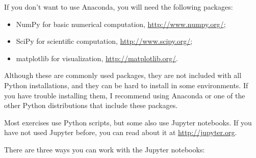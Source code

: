If you don't want to use Anaconda, you will need the following
packages:

\begin{itemize}
	
	\item NumPy for basic numerical computation, \url{http://www.numpy.org/};
	
	\item SciPy for scientific computation,
	\url{http://www.scipy.org/};
	
	\item matplotlib for visualization, \url{http://matplotlib.org/}.
	
\end{itemize}

Although these are commonly used packages, they are not included with
all Python installations, and they can be hard to install in some
environments.  If you have trouble installing them, I
recommend using Anaconda or one of the other Python distributions
that include these packages.

Most exercises use Python scripts, but some also use Jupyter
notebooks.  If you have not used Jupyter before, you can read about
it at \url{http://jupyter.org}.

There are three ways you can work with the Jupyter notebooks:

